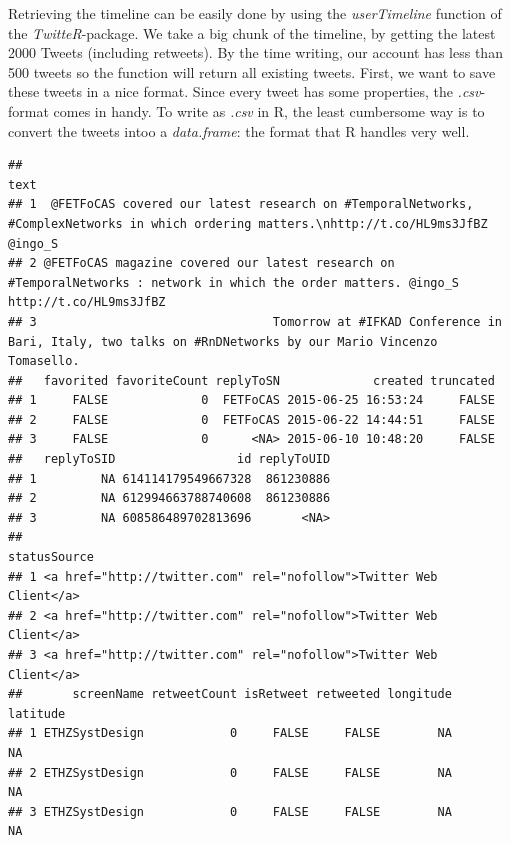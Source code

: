 \documentclass[]{article}
\newenvironment{Shaded}{\begin{snugshade}}{\end{snugshade}}
\newcommand{\KeywordTok}[1]{\textcolor[rgb]{0.13,0.29,0.53}{\textbf{{#1}}}}
\newcommand{\DataTypeTok}[1]{\textcolor[rgb]{0.13,0.29,0.53}{{#1}}}
\newcommand{\DecValTok}[1]{\textcolor[rgb]{0.00,0.00,0.81}{{#1}}}
\newcommand{\StringTok}[1]{\textcolor[rgb]{0.31,0.60,0.02}{{#1}}}
\newcommand{\OtherTok}[1]{\textcolor[rgb]{0.56,0.35,0.01}{{#1}}}
\newcommand{\NormalTok}[1]{{#1}}
\begin{document}
Retrieving the timeline can be easily done by using the
\emph{userTimeline} function of the \emph{TwitteR}-package. We take a
big chunk of the timeline, by getting the latest 2000 Tweets (including
retweets). By the time writing, our account has less than 500 tweets so
the function will return all existing tweets. First, we want to save
these tweets in a nice format. Since every tweet has some properties,
the \emph{.csv}-format comes in handy. To write as \emph{.csv} in R, the
least cumbersome way is to convert the tweets intoo a \emph{data.frame}:
the format that R handles very well.

\begin{Shaded}
\end{Shaded}

\begin{verbatim}
##                                                                                                                                       text
## 1  @FETFoCAS covered our latest research on #TemporalNetworks, #ComplexNetworks in which ordering matters.\nhttp://t.co/HL9ms3JfBZ @ingo_S
## 2 @FETFoCAS magazine covered our latest research on #TemporalNetworks : network in which the order matters. @ingo_S http://t.co/HL9ms3JfBZ
## 3                                 Tomorrow at #IFKAD Conference in Bari, Italy, two talks on #RnDNetworks by our Mario Vincenzo Tomasello.
##   favorited favoriteCount replyToSN             created truncated
## 1     FALSE             0  FETFoCAS 2015-06-25 16:53:24     FALSE
## 2     FALSE             0  FETFoCAS 2015-06-22 14:44:51     FALSE
## 3     FALSE             0      <NA> 2015-06-10 10:48:20     FALSE
##   replyToSID                 id replyToUID
## 1         NA 614114179549667328  861230886
## 2         NA 612994663788740608  861230886
## 3         NA 608586489702813696       <NA>
##                                                         statusSource
## 1 <a href="http://twitter.com" rel="nofollow">Twitter Web Client</a>
## 2 <a href="http://twitter.com" rel="nofollow">Twitter Web Client</a>
## 3 <a href="http://twitter.com" rel="nofollow">Twitter Web Client</a>
##       screenName retweetCount isRetweet retweeted longitude latitude
## 1 ETHZSystDesign            0     FALSE     FALSE        NA       NA
## 2 ETHZSystDesign            0     FALSE     FALSE        NA       NA
## 3 ETHZSystDesign            0     FALSE     FALSE        NA       NA
\end{verbatim}
\end{document}
